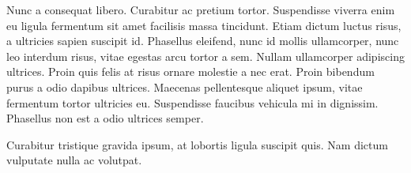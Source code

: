 Nunc a consequat libero. Curabitur ac pretium tortor. Suspendisse viverra enim eu ligula fermentum sit amet facilisis massa tincidunt. Etiam dictum luctus risus, a ultricies sapien suscipit id. Phasellus eleifend, nunc id mollis ullamcorper, nunc leo interdum risus, vitae egestas arcu tortor a sem. Nullam ullamcorper adipiscing ultrices. Proin quis felis at risus ornare molestie a nec erat. Proin bibendum purus a odio dapibus ultrices. Maecenas pellentesque aliquet ipsum, vitae fermentum tortor ultricies eu. Suspendisse faucibus vehicula mi in dignissim. Phasellus non est a odio ultrices semper.

Curabitur tristique gravida ipsum, at lobortis ligula suscipit quis. Nam dictum vulputate nulla ac volutpat.

